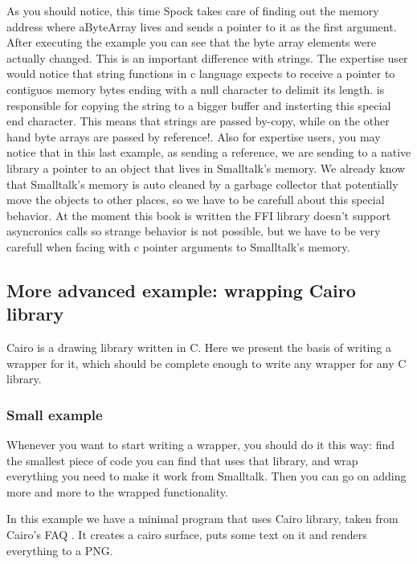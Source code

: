 \documentclass[a4paper,10pt,twoside]{book}
\begin{document}
As you should notice, this time Spock takes care of finding out the memory address where aByteArray lives and sends a pointer to it as the first argument. After executing the example you can see that the byte array elements were actually changed. This is an important difference with strings. The expertise user would notice that string functions in c language expects to receive a pointer to contiguos memory bytes ending with a null character to delimit its length. \Spock is responsible for copying the string to a bigger buffer and insterting this special end character. This means that strings are passed by-copy, while on the other hand byte arrays are passed by reference!. Also for expertise users, you may notice that in this last example, as sending a reference, we are sending to a native library a pointer to an object that lives in Smalltalk's memory. We already know that Smalltalk's memory is auto cleaned by a garbage collector that potentially move the objects to other places, so we have to be carefull about this special behavior. At the moment this book is written the FFI library doesn't support asyncronics calls so strange behavior is not possible, but we have to be very carefull when facing with c pointer arguments to Smalltalk's memory.

\subsection{More advanced example: wrapping Cairo library}

Cairo is a drawing library written in C. Here we present
the basis of writing a wrapper for it, which should be
complete enough to write any wrapper for any C library.

\subsubsection*{Small example}

Whenever you want to start writing a wrapper, you should do
it this way: find the smallest piece of code you can find 
that uses that library, and wrap everything you need to make
it work from Smalltalk. Then you can go on adding more and
more to the wrapped functionality. 

In this example we have a minimal program that uses Cairo
library, taken from Cairo's FAQ .
It creates a cairo surface, puts some text on it
and renders everything to a PNG.
\end{document}

